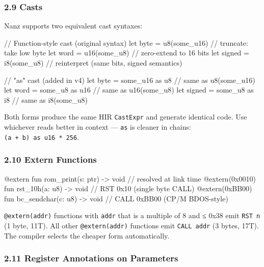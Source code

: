 \documentclass[
  11pt,
]{article}
\newenvironment{Shaded}{}{}
\newcommand{\NormalTok}[1]{#1}
\begin{document}
\subsubsection{2.9 Casts}\label{casts}

Nanz supports two equivalent cast syntaxes:

\begin{Shaded}
\begin{Highlighting}[]
\NormalTok{// Function{-}style cast (original syntax)}
\NormalTok{let byte = u8(some\_u16)     // truncate: take low byte}
\NormalTok{let word = u16(some\_u8)     // zero{-}extend to 16 bits}
\NormalTok{let signed = i8(some\_u8)    // reinterpret (same bits, signed semantics)}

\NormalTok{// "as" cast (added in v4)}
\NormalTok{let byte = some\_u16 as u8   // same as u8(some\_u16)}
\NormalTok{let word = some\_u8 as u16   // same as u16(some\_u8)}
\NormalTok{let signed = some\_u8 as i8  // same as i8(some\_u8)}
\end{Highlighting}
\end{Shaded}

Both forms produce the same HIR \texttt{CastExpr} and generate identical
code. Use whichever reads better in context --- \texttt{as} is cleaner
in chains: \texttt{(a\ +\ b)\ as\ u16\ *\ 256}.

\subsubsection{2.10 Extern Functions}\label{extern-functions}

\begin{Shaded}
\begin{Highlighting}[]
\NormalTok{@extern fun rom\_print(s: ptr) {-}\textgreater{} void           // resolved at link time}
\NormalTok{@extern(0x0010) fun rst\_10h(a: u8) {-}\textgreater{} void      // RST 0x10 (single byte CALL)}
\NormalTok{@extern(0xBB00) fun bc\_sendchar(c: u8) {-}\textgreater{} void  // CALL 0xBB00 (CP/M BDOS{-}style)}
\end{Highlighting}
\end{Shaded}

\texttt{@extern(addr)} functions with \texttt{addr} that is a multiple
of 8 and ≤ 0x38 emit \texttt{RST\ n} (1 byte, 11T). All other
\texttt{@extern(addr)} functions emit \texttt{CALL\ addr} (3 bytes,
17T). The compiler selects the cheaper form automatically.

\subsubsection{2.11 Register Annotations on
Parameters}\label{register-annotations-on-parameters}
\end{document}
